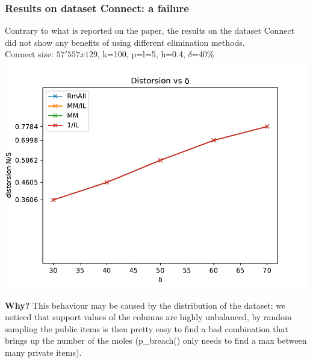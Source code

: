 \documentclass{beamer}
\begin{document}
\begin{frame}[fragile]
\frametitle{Results on dataset Connect: a failure}
Contrary to what is reported on the paper, the results on the dataset Connect did not show any benefits of using different elimination methods.\\
Connect size: $57'557x129$, k=100, p=l=5, h=0.4, $\delta$=40\%
\includegraphics[scale=0.34]{img/plt_connect_delta_random}

\textbf{Why?} This behaviour may be caused by the distribution of the dataset: we noticed that support values of the columns are highly unbalanced, by random sampling the public items is then pretty easy to find a bad combination that brings up the number of the moles (p\_breach() only needs to find a max between many private items).
\end{frame}
\end{document}
